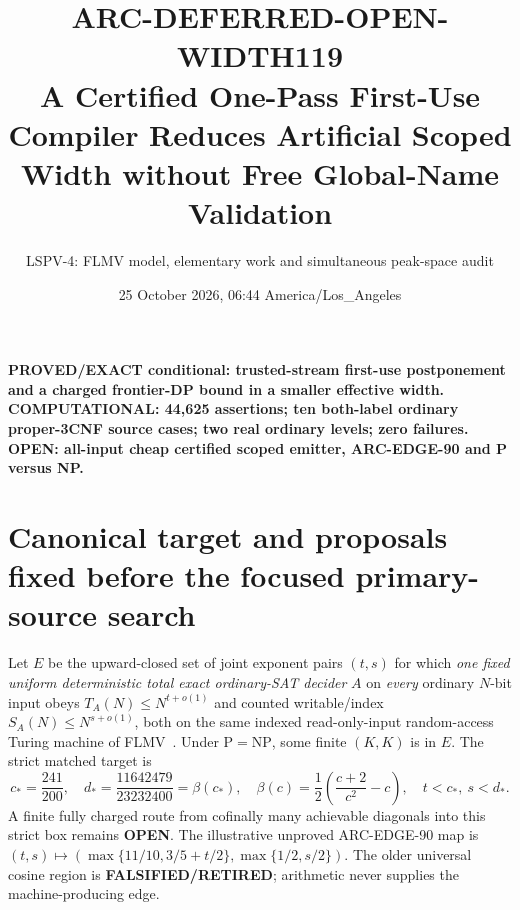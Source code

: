\documentclass[11pt]{article}
\title{ARC-DEFERRED-OPEN-WIDTH119\\
\large A Certified One-Pass First-Use Compiler Reduces Artificial Scoped Width without Free Global-Name Validation}
\author{LSPV-4: FLMV model, elementary work and simultaneous peak-space audit}
\date{25 October 2026, 06:44 America/Los\_Angeles}
\newcommand{\OPEN}{\textbf{OPEN}}
\begin{document}
\maketitle
\begin{center}
\textbf{PROVED/EXACT conditional: trusted-stream first-use postponement and a charged frontier-DP bound in a smaller effective width.}\\
\textbf{COMPUTATIONAL: 44,625 assertions; ten both-label ordinary proper-3CNF source cases; two real ordinary levels; zero failures.}\\
\textbf{OPEN: all-input cheap certified scoped emitter, ARC-EDGE-90 and P versus NP.}
\end{center}

\section{Canonical target and proposals fixed before the focused primary-source search}
Let $E$ be the upward-closed set of joint exponent pairs $(t,s)$ for which
\emph{one fixed uniform deterministic total exact ordinary-SAT decider}
$A$ on \emph{every} ordinary $N$-bit input obeys
$T_A(N)\le N^{t+o(1)}$ and counted writable/index
$S_A(N)\le N^{s+o(1)}$, both on the same indexed
read-only-input random-access Turing machine of FLMV~\cite{flmv}.
Under $\mathrm P=\mathrm{NP}$, some finite $(K,K)$ is in $E$.
The strict matched target is
\[
c_*=\frac{241}{200},\quad
d_*=\frac{11642479}{23232400}=\beta(c_*),\quad
\beta(c)=\frac12\left(\frac{c+2}{c^2}-c\right),\quad
t<c_*,\ s<d_*.
\]
A finite fully charged route from cofinally many achievable diagonals
into this strict box remains \OPEN.
The illustrative unproved ARC-EDGE-90 map is
$(t,s)\mapsto(\max\{11/10,3/5+t/2\},
\max\{1/2,s/2\})$.
The older universal cosine region is \textbf{FALSIFIED/RETIRED};
arithmetic never supplies the machine-producing edge.
\end{document}
